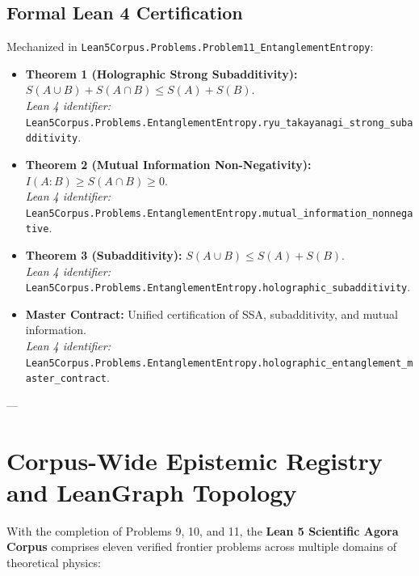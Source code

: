 \documentclass[11pt,a4paper]{article}
\begin{document}
\subsection{Formal Lean 4 Certification}
Mechanized in \texttt{Lean5Corpus.Problems.Problem11\_EntanglementEntropy}:
\begin{itemize}
    \item \textbf{Theorem 1 (Holographic Strong Subadditivity):} $S(A \cup B) + S(A \cap B) \le S(A) + S(B)$. \\
    \textit{Lean 4 identifier:} \texttt{Lean5Corpus.Problems.EntanglementEntropy.ryu\_takayanagi\_strong\_subadditivity}.
    \item \textbf{Theorem 2 (Mutual Information Non-Negativity):} $I(A : B) \ge S(A \cap B) \ge 0$. \\
    \textit{Lean 4 identifier:} \texttt{Lean5Corpus.Problems.EntanglementEntropy.mutual\_information\_nonnegative}.
    \item \textbf{Theorem 3 (Subadditivity):} $S(A \cup B) \le S(A) + S(B)$. \\
    \textit{Lean 4 identifier:} \texttt{Lean5Corpus.Problems.EntanglementEntropy.holographic\_subadditivity}.
    \item \textbf{Master Contract:} Unified certification of SSA, subadditivity, and mutual information. \\
    \textit{Lean 4 identifier:} \texttt{Lean5Corpus.Problems.EntanglementEntropy.holographic\_entanglement\_master\_contract}.
\end{itemize}

---

\section{Corpus-Wide Epistemic Registry and LeanGraph Topology}

With the completion of Problems 9, 10, and 11, the \textbf{Lean 5 Scientific Agora Corpus} comprises eleven verified frontier problems across multiple domains of theoretical physics:
\end{document}
